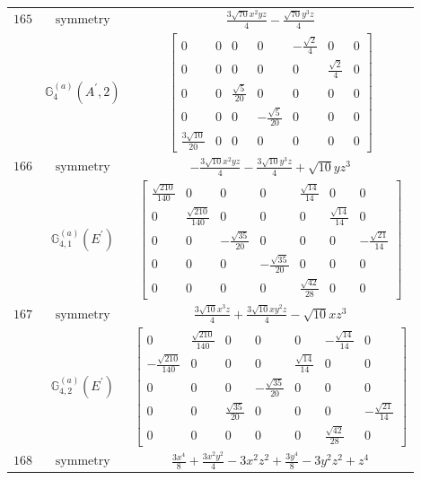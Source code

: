 \documentclass[fleqn,8pt,landscape]{jsarticle}
\begin{document}
\begin{longtable}{ccc}
$ 165 $ & $ \text{symmetry} $ & $ \frac{3 \sqrt{70} x^{2} y z}{4} - \frac{\sqrt{70} y^{3} z}{4} $ \\
$  $ & $ \mathbb{G}_{4}^{(a)}(A^{\prime},2) $ & $ \begin{bmatrix} 0 & 0 & 0 & 0 & - \frac{\sqrt{2}}{4} & 0 & 0 \\ 0 & 0 & 0 & 0 & 0 & \frac{\sqrt{2}}{4} & 0 \\ 0 & 0 & \frac{\sqrt{5}}{20} & 0 & 0 & 0 & 0 \\ 0 & 0 & 0 & - \frac{\sqrt{5}}{20} & 0 & 0 & 0 \\ \frac{3 \sqrt{10}}{20} & 0 & 0 & 0 & 0 & 0 & 0 \end{bmatrix} $ \\ \hline
$ 166 $ & $ \text{symmetry} $ & $ - \frac{3 \sqrt{10} x^{2} y z}{4} - \frac{3 \sqrt{10} y^{3} z}{4} + \sqrt{10} y z^{3} $ \\
$  $ & $ \mathbb{G}_{4,1}^{(a)}(E^{\prime}) $ & $ \begin{bmatrix} \frac{\sqrt{210}}{140} & 0 & 0 & 0 & \frac{\sqrt{14}}{14} & 0 & 0 \\ 0 & \frac{\sqrt{210}}{140} & 0 & 0 & 0 & \frac{\sqrt{14}}{14} & 0 \\ 0 & 0 & - \frac{\sqrt{35}}{20} & 0 & 0 & 0 & - \frac{\sqrt{21}}{14} \\ 0 & 0 & 0 & - \frac{\sqrt{35}}{20} & 0 & 0 & 0 \\ 0 & 0 & 0 & 0 & \frac{\sqrt{42}}{28} & 0 & 0 \end{bmatrix} $ \\ \hline
$ 167 $ & $ \text{symmetry} $ & $ \frac{3 \sqrt{10} x^{3} z}{4} + \frac{3 \sqrt{10} x y^{2} z}{4} - \sqrt{10} x z^{3} $ \\
$  $ & $ \mathbb{G}_{4,2}^{(a)}(E^{\prime}) $ & $ \begin{bmatrix} 0 & \frac{\sqrt{210}}{140} & 0 & 0 & 0 & - \frac{\sqrt{14}}{14} & 0 \\ - \frac{\sqrt{210}}{140} & 0 & 0 & 0 & \frac{\sqrt{14}}{14} & 0 & 0 \\ 0 & 0 & 0 & - \frac{\sqrt{35}}{20} & 0 & 0 & 0 \\ 0 & 0 & \frac{\sqrt{35}}{20} & 0 & 0 & 0 & - \frac{\sqrt{21}}{14} \\ 0 & 0 & 0 & 0 & 0 & \frac{\sqrt{42}}{28} & 0 \end{bmatrix} $ \\ \hline
$ 168 $ & $ \text{symmetry} $ & $ \frac{3 x^{4}}{8} + \frac{3 x^{2} y^{2}}{4} - 3 x^{2} z^{2} + \frac{3 y^{4}}{8} - 3 y^{2} z^{2} + z^{4} $ \\

\end{longtable}
\end{document}
